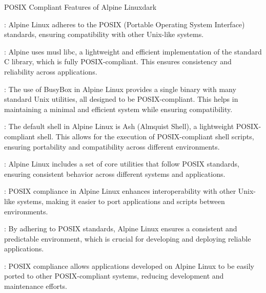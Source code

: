 \label{POSIX Compliant Features of Alpine Linux}
\begin{baseBoxThree}{POSIX Compliant Features of Alpine Linux}{dark}
    \begin{posnexItemize}
        \item[\sA] : Alpine Linux adheres to the POSIX (Portable Operating System Interface) standards, ensuring compatibility with other Unix-like systems.
        \item[\sA] : Alpine uses musl libc, a lightweight and efficient implementation of the standard C library, which is fully POSIX-compliant. This ensures consistency and reliability across applications.
        \item[\sA] : The use of BusyBox in Alpine Linux provides a single binary with many standard Unix utilities, all designed to be POSIX-compliant. This helps in maintaining a minimal and efficient system while ensuring compatibility.
        \item[\sA] : The default shell in Alpine Linux is Ash (Almquist Shell), a lightweight POSIX-compliant shell. This allows for the execution of POSIX-compliant shell scripts, ensuring portability and compatibility across different environments.
        \item[\sA] : Alpine Linux includes a set of core utilities that follow POSIX standards, ensuring consistent behavior across different systems and applications.
        \item[\sA] : POSIX compliance in Alpine Linux enhances interoperability with other Unix-like systems, making it easier to port applications and scripts between environments.
        \item[\sA] : By adhering to POSIX standards, Alpine Linux ensures a consistent and predictable environment, which is crucial for developing and deploying reliable applications.
        \item[\sA] : POSIX compliance allows applications developed on Alpine Linux to be easily ported to other POSIX-compliant systems, reducing development and maintenance efforts.
    \end{posnexItemize}
\end{baseBoxThree}
